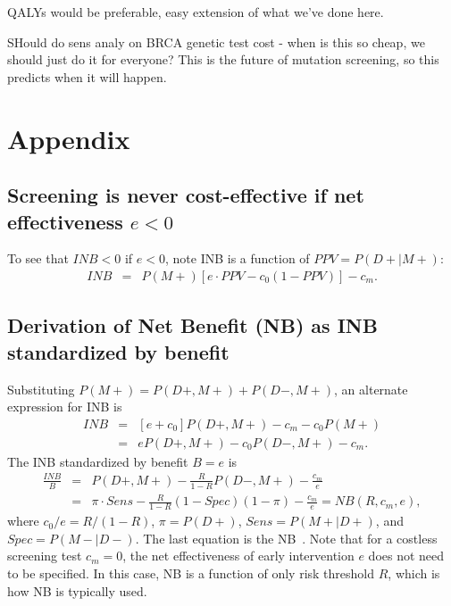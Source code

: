 \documentclass[11pt, letterpaper]{article}
\begin{document}
QALYs would be preferable, easy extension of what we've done here.

SHould do sens analy on BRCA genetic test cost - when is this so cheap, we should just do it for everyone?  This is the future of mutation screening, so this predicts when it will happen.



\appendix 
\section{Appendix}
\label{Appendix}

\subsection{Screening is never cost-effective if net effectiveness $e<0$}
\label{eltzero}
To see that $INB<0$ if $e<0$, note INB is a function of $PPV=P(D+|M+)$: 
\begin{eqnarray*} 
	INB &=& P(M+)[e\cdot PPV - c_0(1-PPV)] - c_m.
\end{eqnarray*}

\subsection{Derivation of Net Benefit (NB) as INB standardized by benefit}
\label{sec:NB}
Substituting $P(M+)=P(D+,M+)+P(D-,M+)$, an alternate expression for INB is
\begin{eqnarray*}
	INB &=& [e+c_0]P(D+,M+) - c_m - c_0P(M+)\\
		  &=& eP(D+,M+) - c_0P(D-,M+) - c_m.	
\end{eqnarray*}
The INB standardized by benefit $B=e$ is
\begin{eqnarray*}
	\frac{INB}{B} &=& P(D+,M+)-\frac{R}{1-R}P(D-,M+) - \frac{c_m}{e} \\
						&=& \pi\cdot Sens-\frac{R}{1-R}(1-Spec)(1-\pi) - \frac{c_m}{e} = NB(R,c_m,e),
\end{eqnarray*}				
where $c_0/e = R/(1-R)$, $\pi=P(D+)$, $Sens=P(M+|D+)$, and $Spec=P(M-|D-)$.  The last equation is the NB~\citep{Vickers2006}.  Note that for a costless screening test $c_m=0$, the net effectiveness of early intervention $e$ does not need to be specified. In this case, NB is a function of only risk threshold $R$, which is how NB is typically used. 
\end{document}

